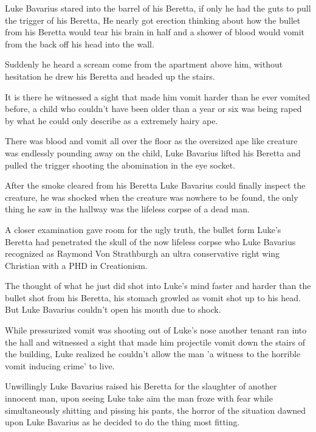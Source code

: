 Luke Bavarius stared into the barrel of his Beretta, if only he had
the guts to pull the trigger of his Beretta, He nearly got erection
thinking about how the bullet from his Beretta would tear his brain
in half and a shower of blood would vomit from the back off his
head into the wall.



Suddenly he heard a scream come from the apartment above him,
without hesitation he drew his Beretta and headed up the
stairs.



It is there he witnessed a sight that made him vomit harder than he
ever vomited before, a child who couldn't have been older
than a year or six was being raped by what he could only describe
as a extremely hairy ape.



There was blood and vomit all over the floor as the oversized ape
like creature was endlessly pounding away on the child, Luke
Bavarius lifted his Beretta and pulled the trigger shooting the
abomination in the eye socket.



After the smoke cleared from his Beretta Luke Bavarius could
finally inspect the creature, he was shocked when the creature was
nowhere to be found, the only thing he saw in the hallway was the
lifeless corpse of a dead man.



A closer examination gave room for the ugly truth, the bullet form
Luke's Beretta had penetrated the skull of the now lifeless
corpse who Luke Bavarius recognized as Raymond Von Strathburgh an
ultra conservative right wing Christian with a PHD in
Creationism.



The thought of what he just did shot into Luke's mind faster
and harder than the bullet shot from his Beretta, his stomach
growled as vomit shot up to his head. But Luke Bavarius
couldn't open his mouth due to shock.



While pressurized vomit was shooting out of Luke's nose
another tenant ran into the hall and witnessed a sight that made
him projectile vomit down the stairs of the building, Luke realized
he couldn't allow the man 'a witness to the horrible vomit
inducing crime' to live.



Unwillingly Luke Bavarius raised his Beretta for the slaughter of
another innocent man, upon seeing Luke take aim the man froze with
fear while simultaneously shitting and pissing his pants, the
horror of the situation dawned upon Luke Bavarius as he decided to
do the thing most fitting.



